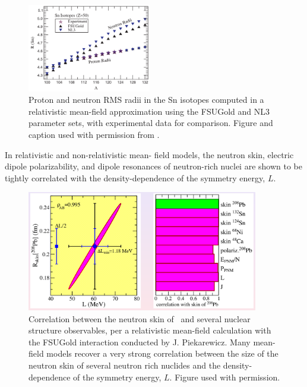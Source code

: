 \begin{figure}
    \centering
    \includegraphics[width=0.48\textwidth]{figures/Piekarewicz2006SnIsotopes.png}
    \caption[Proton and neutron RMS radii in the Sn isotopes computed with FSUGold and NL3
    interactions]
    {
        Proton and neutron RMS radii in the Sn isotopes computed in a relativistic mean-field
        approximation using the FSUGold and NL3 parameter sets, with experimental data for comparison.
        Figure and caption used with permission from \cite{Piekarewicz2006}.
    }
    \label{Piekarewicz2006SnIsotopes}
\end{figure}
In relativistic and non-relativistic mean-
field models, the neutron skin,
electric dipole
polarizability, and dipole resonances of neutron-rich nuclei are
shown to be tightly correlated with the density-dependence of the symmetry
energy, $L$.
\begin{figure}[tb]
    \centering
    \includegraphics[width=0.9\textwidth]{figures/PiekarewiczPb208SkinCorrelation.png}
    \caption[Correlation between the neutron skin of \pbEight\ and several nuclear structure
    observables]
    {
        Correlation between the neutron skin of \pbEight\ and several nuclear structure observables,
        per a relativistic mean-field calculation with the FSUGold interaction
        conducted by J. Piekarewicz. Many
        mean-field models recover a very strong correlation between the size of the
        neutron skin of several neutron rich nuclides and the density-dependence of the symmetry
        energy, $L$. Figure used with permission.
    }
    \label{PiekarewiczPb208SkinCorrelation}
\end{figure}
